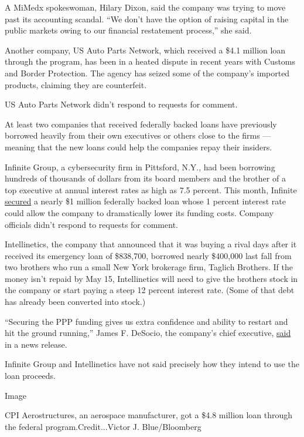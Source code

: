 A MiMedx spokeswoman, Hilary Dixon, said the company was trying to move
past its accounting scandal. ``We don't have the option of raising
capital in the public markets owing to our financial restatement
process,'' she said.

Another company, US Auto Parts Network, which received a \$4.1 million
loan through the program, has been in a heated dispute in recent years
with Customs and Border Protection. The agency has seized some of the
company's imported products, claiming they are counterfeit.

US Auto Parts Network didn't respond to requests for comment.

At least two companies that received federally backed loans have
previously borrowed heavily from their own executives or others close to
the firms --- meaning that the new loans could help the companies repay
their insiders.

Infinite Group, a cybersecurity firm in Pittsford, N.Y., had been
borrowing hundreds of thousands of dollars from its board members and
the brother of a top executive at annual interest rates as high as 7.5
percent. This month, Infinite
\href{https://www.sec.gov/Archives/edgar/data/884650/000165495420004141/igiform8-kpppnotewithupst.htm}{secured}
a nearly \$1 million federally backed loan whose 1 percent interest rate
could allow the company to dramatically lower its funding costs. Company
officials didn't respond to requests for comment.

Intellinetics, the company that announced that it was buying a rival
days after it received its emergency loan of \$838,700, borrowed nearly
\$400,000 last fall from two brothers who run a small New York brokerage
firm, Taglich Brothers. If the money isn't repaid by May 15,
Intellinetics will need to give the brothers stock in the company or
start paying a steep 12 percent interest rate. (Some of that debt has
already been converted into stock.)

``Securing the PPP funding gives us extra confidence and ability to
restart and hit the ground running,'' James F. DeSocio, the company's
chief executive,
\href{https://www.sec.gov/Archives/edgar/data/1081745/000149315220006705/ex99-1.htm}{said}
in a news release.

Infinite Group and Intellinetics have not said precisely how they intend
to use the loan proceeds.

Image

CPI Aerostructures, an aerospace manufacturer, got a \$4.8 million loan
through the federal program.Credit...Victor J. Blue/Bloomberg


